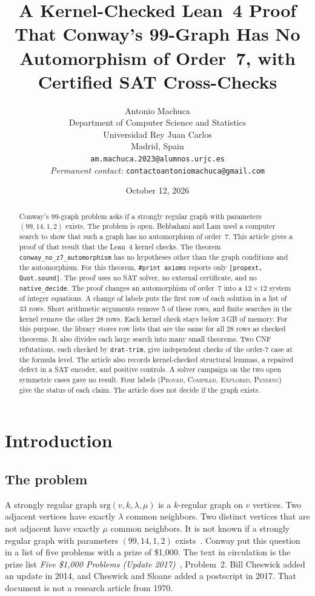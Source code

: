 \documentclass{article}
\title{A Kernel-Checked Lean~4 Proof That Conway's 99-Graph Has No Automorphism of Order~7, with Certified SAT Cross-Checks}
\author{
  Antonio Machuca \\
  Department of Computer Science and Statistics \\
  Universidad Rey Juan Carlos \\
  Madrid, Spain \\
  \texttt{am.machuca.2023@alumnos.urjc.es} \\
  \emph{Permanent contact:} \texttt{contactoantoniomachuca@gmail.com}
}
\date{October 12, 2026}
\theoremstyle{plain}
\theoremstyle{definition}
\numberwithin{equation}{section}
\begin{document}
\maketitle

\begin{abstract}
Conway's 99-graph problem asks if a strongly regular graph with parameters $(99,14,1,2)$ exists. The problem is open.
Behbahani and Lam used a computer search to show that such a graph has no automorphism of order~7.
This article gives a proof of that result that the Lean~4 kernel checks.
The theorem \texttt{conway\_no\_z7\_automorphism} has no hypotheses other than the graph conditions and the automorphism.
For this theorem, \texttt{\#print axioms} reports only \texttt{[propext, Quot.sound]}.
The proof uses no SAT solver, no external certificate, and no \texttt{native\_decide}.
The proof changes an automorphism of order~7 into a $12 \times 12$ system of integer equations.
A change of labels puts the first row of each solution in a list of 33 rows.
Short arithmetic arguments remove 5 of these rows, and finite searches in the kernel remove the other 28 rows.
Each kernel check stays below 3\,GB of memory.
For this purpose, the library stores row lists that are the same for all 28 rows as checked theorems. It also divides each large search into many small theorems.
Two CNF refutations, each checked by \texttt{drat-trim}, give independent checks of the order-7 case at the formula level.
The article also records kernel-checked structural lemmas, a repaired defect in a SAT encoder, and positive controls. A solver campaign on the two open symmetric cases gave no result.
Four labels (\textsc{Proved}, \textsc{Compiled}, \textsc{Explored}, \textsc{Pending}) give the status of each claim.
The article does not decide if the graph exists.
\end{abstract}


\section{Introduction}

\subsection{The problem}

A strongly regular graph $\mathrm{srg}(v, k, \lambda, \mu)$ is a $k$-regular graph on $v$ vertices.
Two adjacent vertices have exactly $\lambda$ common neighbors.
Two distinct vertices that are not adjacent have exactly $\mu$ common neighbors.
It is not known if a strongly regular graph with parameters $(99, 14, 1, 2)$ exists~\cite{brouwer2011spectra,cesarz2025automorphisms}.
Conway put this question in a list of five problems with a prize of \$1{,}000.
The text in circulation is the prize list \emph{Five \$1,000 Problems (Update 2017)}~\cite{conway1970}, Problem~2.
Bill Cheswick added an update in 2014, and Cheswick and Sloane added a postscript in 2017.
That document is not a research article from 1970.
\end{document}
